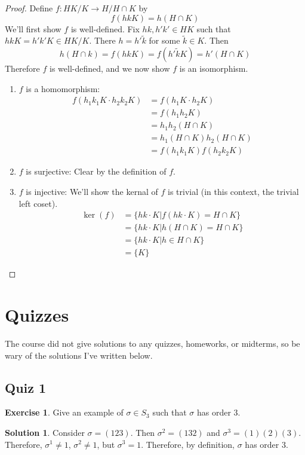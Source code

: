 \documentclass[12pt]{article}
\theoremstyle{definition}
\newtheorem{exercise}{Exercise}
\theoremstyle{definition}
\newtheorem{solution}{Solution}
\begin{document}
\begin{proof}
Define $f : HK / K \to H / H \cap K$ by 
\begin{equation}
	f(hk K) = h (H \cap K)
\end{equation}
We'll first show $f$ is well-defined. Fix $hk, h'k' \in HK$ such that $hk K = h'k'K \in HK/K$. There $h = h'\tilde{k}$ for some $\tilde{k} \in K$. Then
\begin{equation}
	h (H \cap k) = f(hk K) = f(h' \tilde{k} K) = h' (H \cap K)
\end{equation}
Therefore $f$ is well-defined, and we now show $f$ is an isomorphism.
\begin{enumerate}
	\item $f$ is a homomorphism:
	\begin{align*}
	f(h_1 k_1 K \cdot h_2 k_2 K) &= f(h_1 K \cdot h_2 K) \\
	&= f(h_1h_2 K) \\
	&= h_1h_2 (H \cap K) \\
	&= h_1 (H \cap K) h_2 (H \cap K) \\
	&= f(h_1 k_1 K) f(h_2 k_2 K)
	\end{align*}
	\item $f$ is surjective: Clear by the definition of $f$. 
	\item $f$ is injective: We'll show the kernal of $f$ is trivial (in this context, the trivial left coset). 
	\begin{align*}
		\ker(f) &= \{ hk \cdot K | f(hk \cdot K) = H \cap K \} \\
		&= \{ hk \cdot K | h (H \cap K) = H \cap K \} \\
		&= \{ hk \cdot K | h \in H \cap K \} \tag{$h (H\cap K) = H \cap K \iff h \in H\cap K$} \\
		&= \{K \}
	\end{align*}
\end{enumerate}
\end{proof}

\section{Quizzes}
The course did not give solutions to any quizzes, homeworks, or midterms, so be wary of the solutions I've written below. 

\subsection{Quiz 1}

\begin{exercise}
Give an example of $\sigma \in S_3$ such that $\sigma$ has order 3. 
\end{exercise}
\begin{solution}
Consider $\sigma = (1 2 3)$. Then $\sigma^2 = (1 3 2)$ and $\sigma^3 = (1)(2)(3)$. Therefore, $\sigma^1 \neq 1$, $\sigma^2 \neq 1$, but $\sigma^3 = 1$. Therefore, by definition, $\sigma$ has order $3$.
\end{solution}
\end{document}
